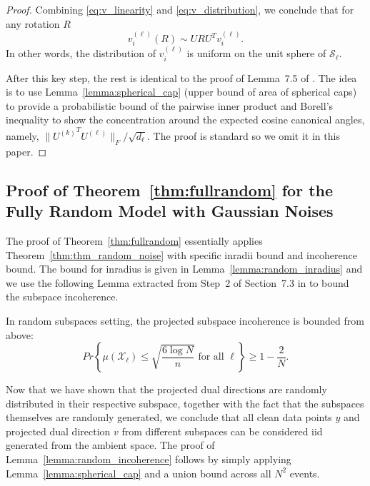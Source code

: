 \documentclass[twoside,11pt]{article}
\numberwithin{equation}{section}
\begin{document}
\begin{proof}
Combining \eqref{eq:v_linearity} and \eqref{eq:v_distribution}, we conclude that for any rotation $R$
$$v_i^{(\ell)}(R)\sim URU^Tv_i^{(\ell)}.$$
In other words, the distribution of $v_i^{(\ell)}$ is uniform on the unit sphere of $\mathcal{S}_{\ell}$.


After this key step, the rest is identical to the proof of Lemma~7.5 of \citet{soltanolkotabi2011geometric}. The idea is to use Lemma~\ref{lemma:spherical_cap} (upper bound of area of spherical caps) to provide a probabilistic bound of the pairwise inner product and Borell's inequality to show the concentration around the expected cosine canonical angles, namely, $\|{U^{(k)}}^TU^{(\ell)}\|_F/\sqrt{d_{\ell}}$. The proof is standard so we omit it in this paper.
\end{proof}







\subsection{Proof of Theorem~\ref{thm:fullrandom} for the Fully Random Model with Gaussian Noises}
The proof of Theorem~\ref{thm:fullrandom} essentially applies Theorem~\ref{thm:thm_random_noise} with specific inradii bound and incoherence bound. The bound for inradius is given in Lemma~\ref{lemma:random_inradius} and we use the following Lemma extracted from Step~2 of Section~7.3 in \citet{soltanolkotabi2011geometric} to bound the subspace incoherence.
\begin{lemma}\label{lemma:random_incoherence}
In random subspaces setting, the projected subspace incoherence is bounded from above:
\begin{equation*}
   Pr\left\{\mu(\mathcal{X}_{\ell})\leq \sqrt{\frac{6\log N}{n}}\text{ for all }\ell\right\}\geq 1- \frac{2}{N}.
\end{equation*}
\end{lemma}
Now that we have shown that the projected dual directions are randomly distributed in their respective subspace, together with the fact that the subspaces themselves are randomly generated, we conclude that all clean data points $y$ and projected dual direction $v$ from different subspaces can be considered iid generated from the ambient space. The proof of Lemma~\ref{lemma:random_incoherence} follows by simply applying Lemma~\ref{lemma:spherical_cap} and a union bound across all $N^2$ events.
\end{document}
